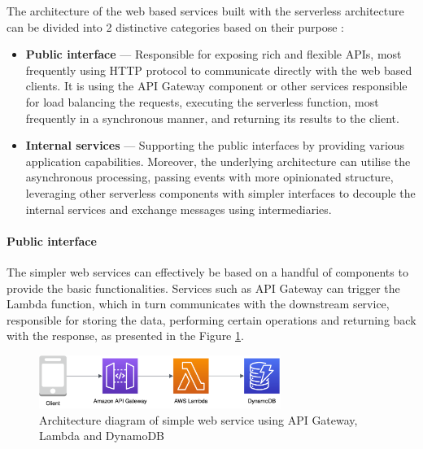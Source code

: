 The architecture of the web based services built with the serverless architecture can be divided into 2 distinctive categories based on their purpose \cite{AWSReinventBuildingMicroservicesWithAWSLambda}:

\begin{itemize}
   \item \textbf{Public interface} --- Responsible for exposing rich and flexible APIs, most frequently using HTTP protocol to communicate directly with the web based clients. It is using the API Gateway component or other services responsible for load balancing the requests, executing the serverless function, most frequently in a synchronous manner, and returning its results to the client.
   \item \textbf{Internal services} --- Supporting the public interfaces by providing various application capabilities. Moreover, the underlying architecture can utilise the asynchronous processing, passing events with more opinionated structure, leveraging other serverless components with simpler interfaces to decouple the internal services and exchange messages using intermediaries.
\end{itemize}

\paragraph{Public interface} \label{chapter:public-interfaces}

The simpler web services can effectively be based on a handful of components to provide the basic functionalities. Services such as API Gateway can trigger the Lambda function, which in turn communicates with the downstream service, responsible for storing the data, performing certain operations and returning back with the response, as presented in the Figure \ref{fig:simple-web-service-diagram}.

\begin{figure}[H]
   \centering
   \includegraphics[width=0.7\textwidth]{assets/04-serverless-for-web-apps/simpleWebService.png}
   \caption{Architecture diagram of simple web service using API Gateway, Lambda and DynamoDB}
   \label{fig:simple-web-service-diagram}
\end{figure}

